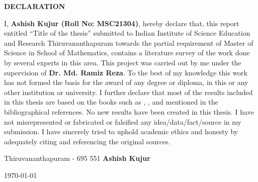 \thispagestyle{empty}
\begin{center}
{\Large{\bf{DECLARATION}}}
\end{center}

\noindent

I, \textbf{Ashish Kujur (Roll No: MSC21304)}, hereby declare that, this report entitled “Title of the thesis” submitted to Indian Institute of Science Education and Research Thiruvananthapuram towards the partial requirement of Master of Science in School of Mathematics,  contains a literature survey of the work done by several experts in this area.  This project was carried out by me under the supervision of \textbf{Dr. Md. Ramiz Reza}.  To the best of my knowledge this work has not formed the basis for the award of any degree or diploma, in this or any other institution or university. I further declare that most of the results included in this thesis are based on the books such as \cite{hoffman2007banach}, \cite{mashreghi2009representation}, \cite{koosis1998introduction} and \cite{axler2013harmonic} mentioned in the bibliographical references. No new results have been created in this thesis. I have not misrepresented or fabricated or falsified any idea/data/fact/source in my submission. I have sincerely tried to uphold academic ethics and honesty by adequately citing and referencing the original sources. 

\vspace{4cm} %

\noindent Thiruvananthapuram - 695 551 \hfill \textbf{Ashish Kujur}

\noindent \today \hfill

\clearpage
